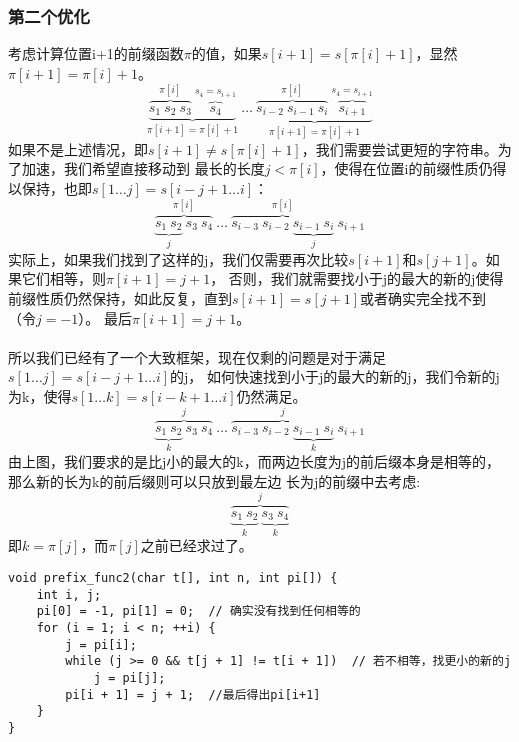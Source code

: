         \subsubsection{第二个优化}
            考虑计算位置i+1的前缀函数$\pi$的值，如果$s[i+1]=s[\pi[i]+1]$，显然$\pi[i+1]=\pi[i]+1$。
            $$ \underbrace{\overbrace{s_1 ~ s_2 ~ s_3}^{\pi[i]} ~ \overbrace{s_4}^{s_4 = s_{i+1}}}_{\pi[i+1] = \pi[i] + 1} ~ \dots ~ 
            \underbrace{\overbrace{s_{i-2} ~ s_{i-1} ~ s_{i}}^{\pi[i]} ~ \overbrace{s_{i+1}}^{s_4 = s_{i+1}}}_{\pi[i+1] = \pi[i] + 1} $$
            如果不是上述情况，即$s[i+1] \neq s[\pi[i]+1]$，我们需要尝试更短的字符串。为了加速，我们希望直接移动到
            最长的长度$j<\pi[i]$，使得在位置i的前缀性质仍得以保持，也即$s[1 \dots j] = s[i-j+1 \dots i]$：
            $$\overbrace{\underbrace{s_1 ~ s_2}_j ~ s_3 ~ s_4}^{\pi[i]} ~ \dots ~ \overbrace{s_{i-3} ~ s_{i-2} ~ \underbrace{s_{i-1} ~ s_{i}}_j}^{\pi[i]} ~ s_{i+1}$$
            实际上，如果我们找到了这样的j，我们仅需要再次比较$s[i+1]$和$s[j+1]$。如果它们相等，则$\pi[i+1]=j+1$，
            否则，我们就需要找小于j的最大的新的j使得前缀性质仍然保持，如此反复，直到$s[i+1]=s[j+1]$或者确实完全找不到（令$j=-1$）。
            最后$\pi[i+1]=j+1$。\\\\
            所以我们已经有了一个大致框架，现在仅剩的问题是对于满足$s[1 \dots j] = s[i-j+1 \dots i]$的j，
            如何快速找到小于j的最大的新的j，我们令新的j为k，使得$s[1 \dots k] = s[i-k+1 \dots i]$仍然满足。
            $$\overbrace{\underbrace{s_1 ~ s_2}_k ~ s_3 ~ s_4}^j ~ \dots ~ \overbrace{s_{i-3} ~ s_{i-2} ~ \underbrace{s_{i-1} ~ s_{i}}_k}^j ~s_{i+1}$$
            由上图，我们要求的是比j小的最大的k，而两边长度为j的前后缀本身是相等的，那么新的长为k的前后缀则可以只放到最左边
            长为j的前缀中去考虑:
            $$\overbrace{\underbrace{s_1 ~ s_2}_k ~ \underbrace{s_3 ~ s_4}_k}^j$$
            即$k=\pi[j]$，而$\pi[j]$之前已经求过了。
            \begin{lstlisting}
void prefix_func2(char t[], int n, int pi[]) {
    int i, j;
    pi[0] = -1, pi[1] = 0;  // 确实没有找到任何相等的
    for (i = 1; i < n; ++i) {
        j = pi[i];
        while (j >= 0 && t[j + 1] != t[i + 1])  // 若不相等，找更小的新的j
            j = pi[j];
        pi[i + 1] = j + 1;  //最后得出pi[i+1]
    }
}

            \end{lstlisting}
